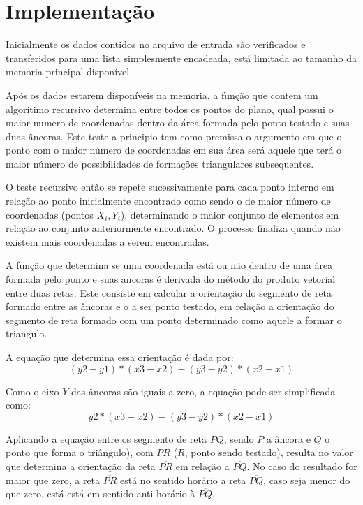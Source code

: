 \documentclass[12pt,a4paper]{article}
\begin{document}
\section{Implementação}

Inicialmente os dados contidos no arquivo de entrada são verificados e transferidos para uma lista simplesmente encadeada, está limitada ao tamanho da memoria principal disponível.

Após os dados estarem disponíveis na memoria, a função que contem um algorítimo recursivo determina entre todos os pontos do plano, qual possui o maior numero de coordenadas dentro da área formada pelo ponto testado e suas duas âncoras. Este teste a principio tem como premissa o argumento em que o ponto com o maior número de coordenadas em sua área será aquele que terá o maior número de possibilidades de formações triangulares subsequentes.

O teste recursivo então se repete sucessivamente para cada ponto interno em relação ao ponto inicialmente encontrado como sendo o de maior número de coordenadas (pontos $X_i,Y_i$), determinando o maior conjunto de elementos em relação ao conjunto anteriormente encontrado. O processo finaliza quando não existem mais coordenadas a serem encontradas.

A função que determina se uma coordenada está ou não dentro de uma área formada pelo ponto e suas ancoras é derivada do método do produto vetorial entre duas retas.\cite{jules:test} Este consiste em calcular a orientação do segmento de reta formado entre as âncoras e o a ser ponto testado, em relação a orientação do segmento de reta formado com um ponto determinado como aquele a formar o triangulo.

A equação que determina essa orientação é dada por:
\[(y2-y1)*(x3-x2) - (y3-y2)*(x2-x1)\]

Como o eixo $Y$ das âncoras são iguais a zero, a equação pode ser simplificada como:\\ \[y2*(x3-x2) - (y3-y2)*(x2-x1)\]

Aplicando a equação entre os segmento de reta $\overline{PQ}$, sendo $P$ a âncora e $Q$ o ponto que forma o triângulo), com $\overline{PR}$ ($R$, ponto sendo testado), resulta no valor que determina a orientação da reta $\overline{PR}$ em relação a $\overline{PQ}$. No caso do resultado for maior que zero, a reta $\overline{PR}$ está no sentido horário a reta $\overline{PQ}$, caso seja menor do que zero, está está em sentido anti-horário à  $\overline{PQ}$.
\end{document}
